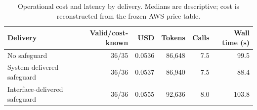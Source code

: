 \begin{table}[t]
\caption{Operational cost and latency by delivery. Medians are descriptive; cost is reconstructed from the frozen AWS price table.}
\label{tab:v02-cost}
\centering
\small
\setlength{\tabcolsep}{4pt}
\begin{tabular}{lrrrrr}
\toprule
Delivery & Valid/cost-known & USD & Tokens & Calls & Wall time (s) \\
\midrule
No safeguard & 36/35 & 0.0536 & 86,648 & 7.5 & 99.5 \\
System-delivered safeguard & 36/36 & 0.0537 & 86,940 & 7.5 & 88.4 \\
Interface-delivered safeguard & 36/36 & 0.0555 & 92,636 & 8.0 & 103.8 \\
\bottomrule
\end{tabular}
\end{table}
